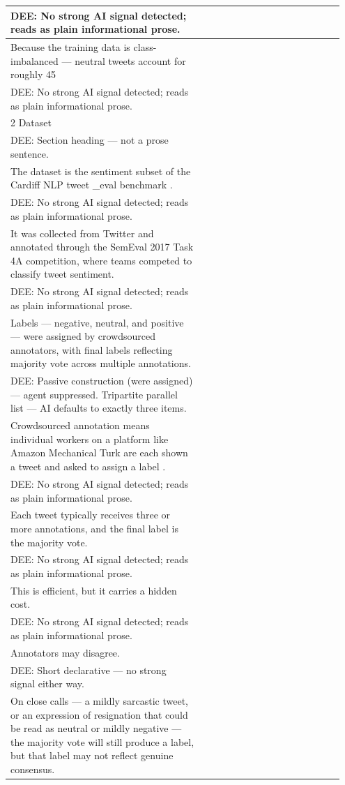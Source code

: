 \documentclass[11pt]{article}
\begin{document}
\begin{longtable}{|p{0.55\linewidth}|p{0.40\linewidth}|}
\hline
DEE: No strong AI signal detected; reads as plain informational prose. & \\
\hline
Because the training data is class-imbalanced --- neutral tweets account for roughly 45 & \\[2pt]
\hline
DEE: No strong AI signal detected; reads as plain informational prose. & \\
\hline
2 Dataset & \\[2pt]
\hline
DEE: Section heading --- not a prose sentence. & \\
\hline
The dataset is the sentiment subset of the Cardiff NLP tweet \_eval benchmark . & \\[2pt]
\hline
DEE: No strong AI signal detected; reads as plain informational prose. & \\
\hline
It was collected from Twitter and annotated through the SemEval 2017 Task 4A competition, where teams competed to classify tweet sentiment. & \\[2pt]
\hline
DEE: No strong AI signal detected; reads as plain informational prose. & \\
\hline
Labels --- negative, neutral, and positive --- were assigned by crowdsourced annotators, with final labels reflecting majority vote across multiple annotations. & \\[2pt]
\hline
DEE: Passive construction (were assigned) --- agent suppressed. Tripartite parallel list --- AI defaults to exactly three items. & \\
\hline
Crowdsourced annotation means individual workers on a platform like Amazon Mechanical Turk are each shown a tweet and asked to assign a label . & \\[2pt]
\hline
DEE: No strong AI signal detected; reads as plain informational prose. & \\
\hline
Each tweet typically receives three or more annotations, and the final label is the majority vote. & \\[2pt]
\hline
DEE: No strong AI signal detected; reads as plain informational prose. & \\
\hline
This is efficient, but it carries a hidden cost. & \\[2pt]
\hline
DEE: No strong AI signal detected; reads as plain informational prose. & \\
\hline
Annotators may disagree. & \\[2pt]
\hline
DEE: Short declarative --- no strong signal either way. & \\
\hline
On close calls --- a mildly sarcastic tweet, or an expression of resignation that could be read as neutral or mildly negative --- the majority vote will still produce a label, but that label may not reflect genuine consensus. & \\[2pt]

\end{longtable}
\end{document}
